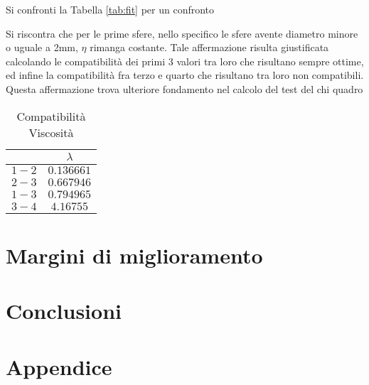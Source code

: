 \documentclass[a4paper,11pt,oneside]{article}
\begin{document}
Si confronti la Tabella \ref{tab:fit} per un confronto 







Si riscontra che per le prime sfere, nello specifico le sfere avente diametro minore o uguale a 2mm, $\eta$ rimanga costante. Tale affermazione risulta giustificata calcolando le compatibilità dei primi 3 valori tra loro che risultano sempre ottime, ed infine la compatibilità fra terzo e quarto che risultano tra loro non compatibili. Questa affermazione trova ulteriore fondamento nel calcolo del test del chi quadro



\begin{table}[h!]
    \centering
    \begin{tabular}{|c|c|}
        \hline
        & $\lambda$\\ \hline
        {\rowcolor[rgb]{0.85,0.85,0.85}}$1-2$ & $0.136661$\\ \hline
        $2-3$ & $0.667946$\\ \hline
        {\rowcolor[rgb]{0.85,0.85,0.85}}$1-3$ & $0.794965$\\ \hline
        $3-4$ & $4.16755$\\ \hline
    \end{tabular}
    \caption{Compatibilità Viscosità}
    \label{tab:comp_eta}
\end{table}


\section{Margini di miglioramento}

\section{Conclusioni}

\section{Appendice}
\end{document}
